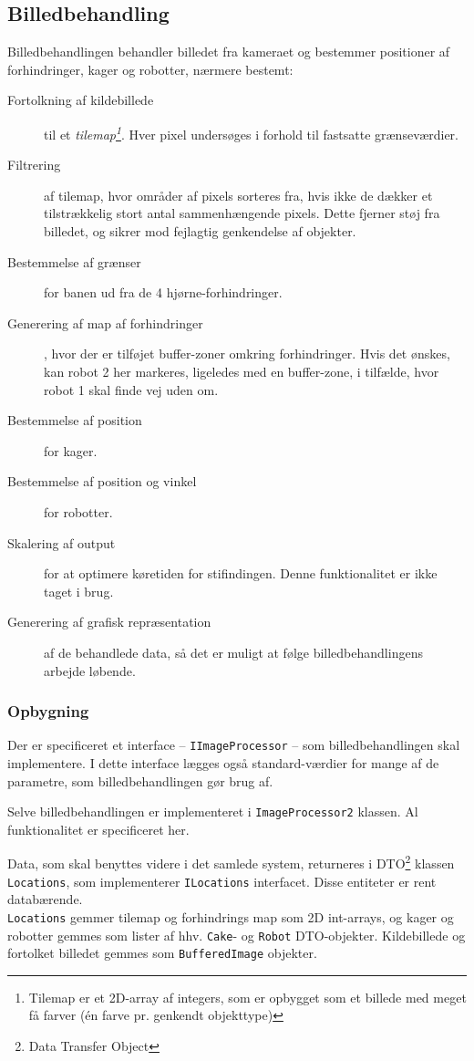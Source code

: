 \subsection{Billedbehandling}
Billedbehandlingen behandler billedet fra kameraet og bestemmer positioner af forhindringer, kager og robotter, nærmere bestemt:
\begin{description}
	\item[Fortolkning af kildebillede] til et \textit{tilemap\footnote{Tilemap er et 2D-array af integers, som er opbygget som et billede med meget få farver (én farve pr. genkendt objekttype)}}. Hver pixel undersøges i forhold til fastsatte grænseværdier.
	\item[Filtrering] af tilemap, hvor områder af pixels sorteres fra, hvis ikke de dækker et tilstrækkelig stort antal sammenhængende pixels. Dette fjerner støj fra billedet, og sikrer mod fejlagtig genkendelse af objekter.
	\item[Bestemmelse af grænser] for banen ud fra de 4 hjørne-forhindringer.
	\item[Generering af map af forhindringer], hvor der er tilføjet buffer-zoner omkring forhindringer. Hvis det ønskes, kan robot 2 her markeres, ligeledes med en buffer-zone, i tilfælde, hvor robot 1 skal finde vej uden om.
	\item[Bestemmelse af position] for kager.
	\item[Bestemmelse af position og vinkel] for robotter.
	\item[Skalering af output] for at optimere køretiden for stifindingen. Denne funktionalitet er ikke taget i brug.
	\item[Generering af grafisk repræsentation] af de behandlede data, så det er muligt at følge billedbehandlingens arbejde løbende.
\end{description}

\subsubsection{Opbygning}
Der er specificeret et interface -- \texttt{IImageProcessor} -- som billedbehandlingen skal implementere. I dette interface lægges også standard-værdier for mange af de parametre, som billedbehandlingen gør brug af.

Selve billedbehandlingen er implementeret i \texttt{ImageProcessor2} klassen.  Al funktionalitet er specificeret her.

Data, som skal benyttes videre i det samlede system, returneres i DTO\footnote{Data Transfer Object} klassen \texttt{Locations}, som implementerer \texttt{ILocations} interfacet. Disse entiteter er rent databærende.\\
\texttt{Locations} gemmer tilemap og forhindrings map som 2D int-arrays, og kager og robotter gemmes som lister af hhv. \texttt{Cake}- og \texttt{Robot} DTO-objekter. Kildebillede og fortolket billedet gemmes som \texttt{BufferedImage} objekter.


